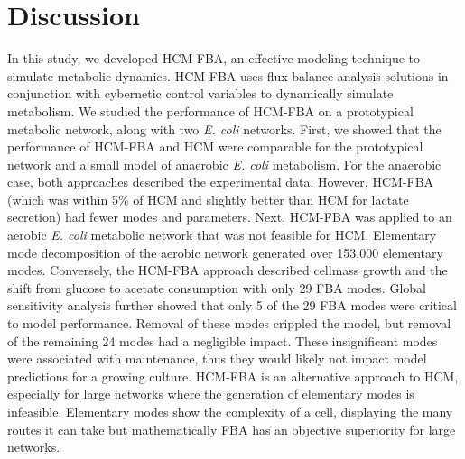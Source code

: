 \documentclass[10pt,twocolumn,twoside,final]{IEEEtran}
\begin{document}
\section{Discussion}
In this study, we developed HCM-FBA, an effective modeling technique to simulate metabolic dynamics.
HCM-FBA uses flux balance analysis solutions in conjunction with cybernetic control variables to dynamically simulate metabolism.
We studied the performance of HCM-FBA on a prototypical metabolic network, along with two \emph{E. coli} networks.
First, we showed that the performance of HCM-FBA and HCM were comparable for the prototypical network and a small model of anaerobic \textit{E. coli} metabolism.
For the anaerobic case, both approaches described the experimental data.
However, HCM-FBA (which was within 5\% of HCM and slightly better than HCM for lactate secretion) had fewer modes and parameters.
Next, HCM-FBA was applied to an aerobic \textit{E. coli} metabolic network that was not feasible for HCM.
Elementary mode decomposition of the aerobic network generated over 153,000 elementary modes.
Conversely, the HCM-FBA approach described cellmass growth and the shift from glucose to acetate consumption with only 29 FBA modes.
Global sensitivity analysis further showed that only 5 of the 29 FBA modes were critical to model performance.
Removal of these modes crippled the model, but removal of the remaining 24 modes had a negligible impact.
These insignificant modes were associated with maintenance, thus they would likely not impact model predictions for a growing culture.
HCM-FBA is an alternative approach to HCM, especially for large networks where the generation of elementary modes is infeasible. Elementary modes show the complexity of a cell, displaying the many routes it can take but mathematically FBA has an objective superiority for large networks.

\end{document}
